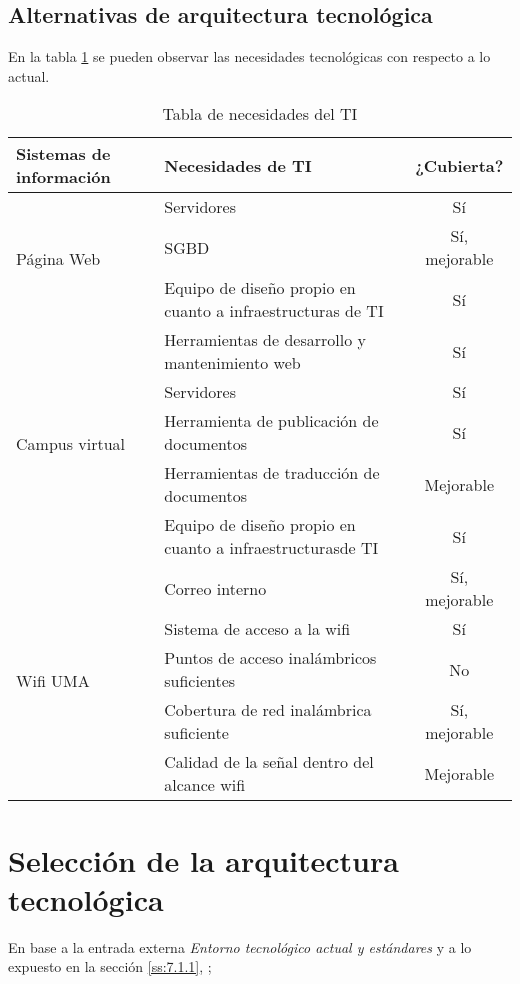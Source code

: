 \documentclass[11pt,a4paper,spanish,twoside]{book}
\begin{document}
\subsection{Alternativas de arquitectura tecnológica} \label{ss:7.1.1}
En la tabla \ref{Tab:TabNec} se pueden observar las necesidades 
tecnológicas con respecto a lo actual.
\begin{table}[!h]
\centering
  \begin{tabular}{p{2.7cm}|p{5cm}|c}
    \textbf{Sistemas de información} & \textbf{Necesidades de TI} &
    \textbf{¿Cubierta?} \\
    \hline \hline
    \multirow{3}{4cm}{Página Web}
    & Servidores & Sí \\ \cline{2-3}
    & SGBD & Sí, mejorable \\ \cline{2-3}
    & Equipo de diseño propio en cuanto a infraestructuras de TI & Sí\\ 
    \cline{2-3}
    & Herramientas de desarrollo y mantenimiento web & Sí\\ \hline
    
    \multirow{3}{4cm}{Campus virtual}
    & Servidores & Sí\\ \cline{2-3}
    & Herramienta de publicación de documentos & Sí\\ \cline{2-3}
    & Herramientas de traducción de documentos & Mejorable\\ \cline{2-3}
    & Equipo de diseño propio en cuanto a infraestructurasde TI & Sí\\
    \cline{2-3}
    & Correo interno & Sí, mejorable\\ \hline
    
    \multirow{3}{4cm}{Wifi UMA}
    & Sistema de acceso a la wifi & Sí\\ \cline{2-3}
    & Puntos de acceso inalámbricos suficientes & No\\ \cline{2-3}
    & Cobertura de red inalámbrica suficiente & Sí, mejorable\\ \cline{2-3}
    & Calidad de la señal dentro del alcance wifi & Mejorable\\ \hline
    
  \end{tabular}
  \caption{Tabla de necesidades del TI} \label{Tab:TabNec}
\end{table}

\section{Selección de la arquitectura tecnológica}
En base a la entrada externa \emph{Entorno tecnológico actual y estándares} y
a lo expuesto 
en la sección \vref{ss:7.1.1}, \emph{}; 
\end{document}

